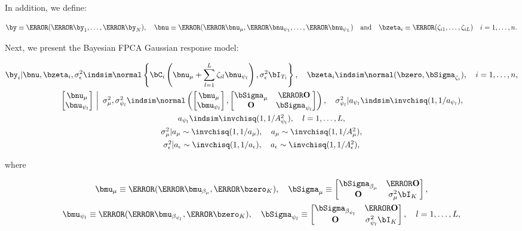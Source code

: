 \documentclass[12pt]{article}
\def\sigsqeps{\sigma^2_{\epsilon}}
\def\aeps{a_{\epsilon}}
\def\Asqeps{A_{\epsilon}^2}
\def\sigsqmu{\sigma^2_{\mu}}
\def\amu{a_{\mu}}
\def\Asqmu{A_{\mu}^2}
\def\numu{\bnu_\mu}
\newcommand\nupsi[1]{\bnu_{\psi_{#1}}}
\newcommand\sigsqpsi[1]{\sigma^2_{\psi_{#1}}}
\newcommand\apsi[1]{a_{\psi_{#1}}}
\newcommand\Asqpsi[1]{A_{\psi_{#1}}^2}
\theoremstyle{plain}
\theoremstyle{definition}
\theoremstyle{remark}
\begin{document}
\noindent In addition, we define:

\begin{equation}
	\by \equiv \T{(\T{\by_1}, \dots, \T{\by_N})}, \quad
	\bnu \equiv \T{(\T{\numu}, \T{\nupsi{1}}, \dots, \T{\nupsi{L}})} \quad
	\text{and} \quad
	\bzeta_i \equiv \T{(\zeta_{i1}, \dots, \zeta_{iL})} \quad i = 1, \dots, n.
\label{partitioned_vectors}
\end{equation}

Next, we present the Bayesian FPCA Gaussian response model:

\begin{equation}
\begin{gathered}
	\by_i | \bnu, \bzeta_i, \sigsqeps \indsim \normal \left\{
		\bC_i \left( \numu + \sum_{l=1}^L \zeta_{il} \nupsi{l} \right), \sigsqeps \bI_{T_i}
	\right\}, \quad
	\bzeta_i \indsim \normal (\bzero, \bSigma_{\zeta_i}), \quad
	i = 1, \dots, n, \\
	$$
	\left.\begin{bmatrix}
		\numu \\
		\nupsi{l}
	\end{bmatrix} \ \right| \ \sigsqmu, \sigsqpsi{l}
		\indsim
			\normal \left(
				\begin{bmatrix}
					\bmu_\mu \\
					\bmu_{\psi_l} \\
				\end{bmatrix},
				\begin{bmatrix}
					\bSigma_\mu & \T{\textbf{O}} \\
					\textbf{O} & \bSigma_{\psi_l}
				\end{bmatrix}
			\right), \quad
	\sigsqpsi{l} | \apsi{l} \indsim \invchisq (1, 1/\apsi{l}), \\
	$$
	\apsi{l} \indsim \invchisq (1, 1/\Asqpsi{l}), \quad l = 1, \dots, L, \\
	$$
	\sigsqmu | \amu \sim \invchisq (1, 1/\amu), \quad \amu \sim \invchisq(1, 1/\Asqmu), \\
	$$
	\sigsqeps | \aeps \sim \invchisq (1, 1/\aeps), \quad \aeps \sim \invchisq(1, 1/\Asqeps),
\end{gathered}
\label{bayes_fpca_mod}
\end{equation}

\noindent where

\begin{equation}
\begin{gathered}
	\bmu_\mu \equiv \T{(\T{\bmu_{\beta_\mu}}, \T{\bzero_K})}, \quad
	\bSigma_\mu \equiv \begin{bmatrix}
		\bSigma_{\beta_\mu} & \T{\textbf{O}} \\
		\textbf{O} & \sigsqmu \bI_{K}
	\end{bmatrix}, \\
	$$
	\bmu_{\psi_l} \equiv \T{(\T{\bmu_{\beta_{\psi_l}}}, \T{\bzero_K})}, \quad
	\bSigma_{\psi_l} \equiv \begin{bmatrix}
		\bSigma_{\beta_{\psi_l}} & \T{\textbf{O}} \\
		\textbf{O} & \sigsqpsi{l} \bI_{K}
	\end{bmatrix}, \quad l = 1, \dots, L,
\end{gathered}
\label{sub_vecs_mats}
\end{equation}
\end{document}
